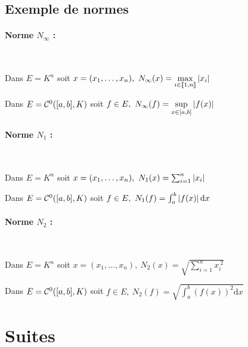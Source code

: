 		 \medskip
		
		 \medskip
			
			
	\subsection{Exemple de normes}

		\paragraph{Norme $N_{\infty}$ :} ~
		
			Dans $E=K^n$ soit $x=(x_1,\dots ,x_n) ,~ N_{\infty}(x) = 
			\underset{i\in{\llbracket 1,n \rrbracket}}{\mathrm{max}} \left\vert x_i \right\vert$
		
			Dans $E={\mathcal{C}}^0([a,b],K)$ soit $f\in E,~N_{\infty} (f) = \underset{x\in [a,b]}{\mathrm{sup}} \left\vert f(x) \right\vert$
			
		\paragraph{Norme $N_1$ :} ~

			Dans $E=K^n$ soit $x=(x_1,\dots ,x_n) ,~ N_1(x) = \sum_{i=1}^n \left\vert x_i \right\vert $
			
			Dans $E={\mathcal{C}}^0([a,b],K)$ soit $f\in E,~N_1 (f) = \int_a^b \left\vert f(x) \right\vert \mathrm{d}x$
			
		\paragraph{Norme $N_2$ :} ~

			Dans $E=K^n$ soit $x=(x_1,\dots ,x_n) ,~ N_2(x) = \sqrt{\sum_{i=1}^n x_i^{~2}} $
			
			Dans $E={\mathcal{C}}^0([a,b],K)$ soit $f\in E,~N_2 (f) = \sqrt{\int_a^b \left( f(x)\right)^2 \mathrm{d}x}$
		
		\medskip


\section{Suites}
		
		\vspace{-15pt}
		\traitd 
